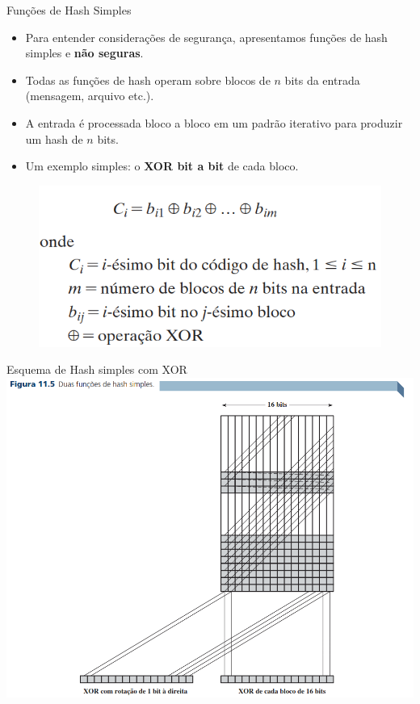 \begin{frame}{Funções de Hash Simples}
    \begin{itemize}
        \item Para entender considerações de segurança, apresentamos funções de hash simples e \textbf{não seguras}.
        \item Todas as funções de hash operam sobre blocos de $n$ bits da entrada (mensagem, arquivo etc.).
        \item A entrada é processada bloco a bloco em um padrão iterativo para produzir um hash de $n$ bits.
        \item Um exemplo simples: o \textbf{XOR bit a bit} de cada bloco.

    \end{itemize}
\begin{figure}
    \centering
    \includegraphics[width=0.5\linewidth]{Figuras/funcao-hash-simples.png}

\end{figure}

\end{frame}




\begin{frame}{Esquema de Hash simples com XOR}
    \centering
    \includegraphics[width=0.65\linewidth]{Figuras/hash-simples-xor.png}
\end{frame}

